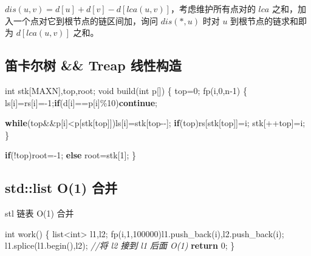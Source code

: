 \documentclass[
]{article}
\newenvironment{Shaded}{}{}
\newcommand{\CommentTok}[1]{\textcolor[rgb]{0.38,0.63,0.69}{\textit{#1}}}
\newcommand{\ControlFlowTok}[1]{\textcolor[rgb]{0.00,0.44,0.13}{\textbf{#1}}}
\newcommand{\DataTypeTok}[1]{\textcolor[rgb]{0.56,0.13,0.00}{#1}}
\newcommand{\DecValTok}[1]{\textcolor[rgb]{0.25,0.63,0.44}{#1}}
\newcommand{\NormalTok}[1]{#1}
\begin{document}
\(dis(u,v) = d[u] + d[v] - d[lca(u,v)]\)，考虑维护所有点对的 \(lca\)
之和，加入一个点对它到根节点的链区间加，询问 \(dis(*,u)\) 时对 \(u\)
到根节点的链求和即为 \(d[lca(u,v)]\) 之和。

\hypertarget{ux7b1bux5361ux5c14ux6811-treap-ux7ebfux6027ux6784ux9020}{%
\subsection{笛卡尔树 \&\& Treap
线性构造}\label{ux7b1bux5361ux5c14ux6811-treap-ux7ebfux6027ux6784ux9020}}

\begin{Shaded}
\begin{Highlighting}[]
\DataTypeTok{int}\NormalTok{ stk[MAXN],top,root;}
\DataTypeTok{void}\NormalTok{ build(}\DataTypeTok{int}\NormalTok{ p[])}
\NormalTok{\{}
\NormalTok{    top=}\DecValTok{0}\NormalTok{;}
\NormalTok{    fp(i,}\DecValTok{0}\NormalTok{,n{-}}\DecValTok{1}\NormalTok{)}
\NormalTok{    \{}
\NormalTok{        ls[i]=rs[i]={-}}\DecValTok{1}\NormalTok{;}\ControlFlowTok{if}\NormalTok{(d[i]==p[i]\%}\DecValTok{10}\NormalTok{)}\ControlFlowTok{continue}\NormalTok{;}

        \ControlFlowTok{while}\NormalTok{(top\&\&p[i]\textless{}p[stk[top]])ls[i]=stk[top{-}{-}];}
        \ControlFlowTok{if}\NormalTok{(top)rs[stk[top]]=i;}
\NormalTok{        stk[++top]=i;}
\NormalTok{    \}}

    \ControlFlowTok{if}\NormalTok{(!top)root={-}}\DecValTok{1}\NormalTok{;}
    \ControlFlowTok{else}\NormalTok{ root=stk[}\DecValTok{1}\NormalTok{];}
\NormalTok{\}}
\end{Highlighting}
\end{Shaded}

\hypertarget{stdlist-o1-ux5408ux5e76}{%
\subsection{std::list O(1) 合并}\label{stdlist-o1-ux5408ux5e76}}

stl 链表 O(1) 合并

\begin{Shaded}
\begin{Highlighting}[]
\DataTypeTok{int}\NormalTok{ work()}
\NormalTok{\{}
\NormalTok{    list\textless{}}\DataTypeTok{int}\NormalTok{\textgreater{} l1,l2;}
\NormalTok{    fp(i,}\DecValTok{1}\NormalTok{,}\DecValTok{100000}\NormalTok{)l1.push\_back(i),l2.push\_back(i);}
\NormalTok{    l1.splice(l1.begin(),l2); }\CommentTok{//将 l2 接到 l1 后面 O(1)}
    \ControlFlowTok{return} \DecValTok{0}\NormalTok{;}
\NormalTok{\}}
\end{Highlighting}
\end{Shaded}
\end{document}
